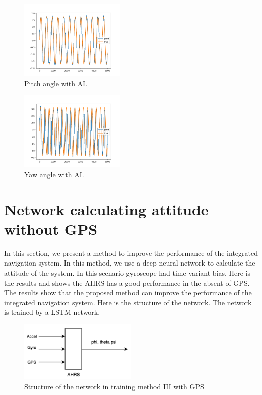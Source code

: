 \documentclass[conference]{IEEEtran}
\begin{document}
    \begin{figure}[H]
        \centerline{\includegraphics[width=0.45\textwidth]{../Figures/part_3_theta.png}}
        \caption{Pitch angle with AI.}
    \end{figure}
    \begin{figure}[H]
        \centerline{\includegraphics[width=0.45\textwidth]{../Figures/part_3_psi.png}}
        \caption{Yaw angle with AI.}
    \end{figure}

    \section{Network calculating attitude without GPS}
    In this section, we present a method to improve the performance of the integrated navigation system. In this method, we use a deep neural network to calculate the attitude of the system. In this scenario gyroscope had time-variant bias. Here is the results and shows the AHRS has a good performance in the absent of GPS. The results show that the proposed method can improve the performance of the integrated navigation system. Here is the structure of the network. The network is trained by a LSTM network.


    \begin{figure}[H]
        \centerline{\includegraphics[width=0.5\textwidth]{../Figures/part_3_network_train_GPS.png}}
        \caption{Structure of the network in training method III with GPS}
    \end{figure}
\end{document}
